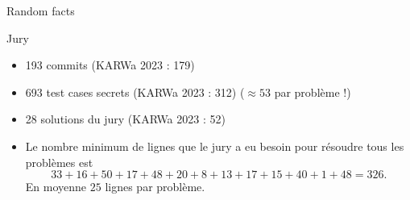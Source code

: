 
\begin{frame}{Random facts}
    \begin{block}{Jury}
      \begin{itemize}[<+->]
        \item 193 commits (KARWa 2023 : 179)
        \item 693 test cases secrets (KARWa 2023 : 312) ($\approx 53$ par problème !)
        \item 28 solutions du jury (KARWa 2023 : 52)
        \item Le nombre minimum de lignes que le jury a eu besoin pour résoudre tous les problèmes est
        \[ 33+16+50+17+48+20+8+13+17+15+40+1+48 = 326. \]
        En moyenne $25$ lignes par problème.
      \end{itemize}
    \end{block}
\end{frame}
